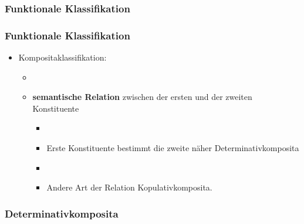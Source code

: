 \subsubsection{Funktionale Klassifikation}

\begin{frame}
\frametitle{Funktionale Klassifikation}

\begin{itemize}
	\item Kompositaklassifikation:
	
	\begin{itemize}
		\item[]		
		\item \textbf{semantische Relation} zwischen der ersten und der zweiten Konstituente
		
		\begin{itemize}
			\item[]
			\item Erste Konstituente bestimmt die zweite näher \ras Determinativkomposita
			\item[]
			\item Andere Art der Relation \ras Kopulativkomposita.
		\end{itemize}
	\end{itemize}
\end{itemize}


\end{frame}


\subsubsection{Determinativkomposita}


